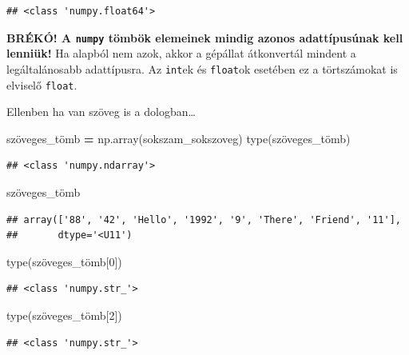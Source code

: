 \documentclass[
]{book}
\newenvironment{Shaded}{\begin{snugshade}}{\end{snugshade}}
\newcommand{\BuiltInTok}[1]{#1}
\newcommand{\DecValTok}[1]{\textcolor[rgb]{0.00,0.00,0.81}{#1}}
\newcommand{\NormalTok}[1]{#1}
\newcommand{\OperatorTok}[1]{\textcolor[rgb]{0.81,0.36,0.00}{\textbf{#1}}}
\begin{document}
\begin{verbatim}
## <class 'numpy.float64'>
\end{verbatim}

\textbf{BRÉKÓ! A \texttt{numpy} tömbök elemeinek mindig azonos adattípusúnak kell lenniük!} Ha alapból nem azok, akkor a gépállat átkonvertál mindent a legáltalánosabb adattípusra. Az \texttt{int}ek és \texttt{float}ok esetében ez a törtszámokat is elviselő \texttt{float}.

Ellenben ha van szöveg is a dologban\ldots{}

\begin{Shaded}
\begin{Highlighting}[]
\NormalTok{szöveges\_tömb }\OperatorTok{=}\NormalTok{ np.array(sokszam\_sokszoveg)}
\BuiltInTok{type}\NormalTok{(szöveges\_tömb)}
\end{Highlighting}
\end{Shaded}

\begin{verbatim}
## <class 'numpy.ndarray'>
\end{verbatim}

\begin{Shaded}
\begin{Highlighting}[]
\NormalTok{szöveges\_tömb}
\end{Highlighting}
\end{Shaded}

\begin{verbatim}
## array(['88', '42', 'Hello', '1992', '9', 'There', 'Friend', '11'],
##       dtype='<U11')
\end{verbatim}

\begin{Shaded}
\begin{Highlighting}[]
\BuiltInTok{type}\NormalTok{(szöveges\_tömb[}\DecValTok{0}\NormalTok{])}
\end{Highlighting}
\end{Shaded}

\begin{verbatim}
## <class 'numpy.str_'>
\end{verbatim}

\begin{Shaded}
\begin{Highlighting}[]
\BuiltInTok{type}\NormalTok{(szöveges\_tömb[}\DecValTok{2}\NormalTok{])}
\end{Highlighting}
\end{Shaded}

\begin{verbatim}
## <class 'numpy.str_'>
\end{verbatim}
\end{document}
